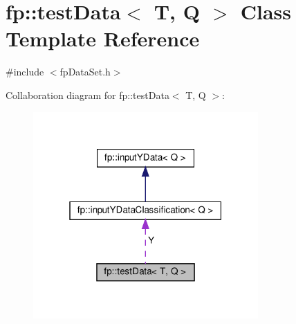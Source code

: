 \hypertarget{classfp_1_1testData}{}\section{fp\+:\+:test\+Data$<$ T, Q $>$ Class Template Reference}
\label{classfp_1_1testData}


{\ttfamily \#include $<$fp\+Data\+Set.\+h$>$}



Collaboration diagram for fp\+:\+:test\+Data$<$ T, Q $>$\+:
\nopagebreak
\begin{figure}[H]
\begin{center}
\leavevmode
\includegraphics[width=244pt]{classfp_1_1testData__coll__graph}
\end{center}
\end{figure}
